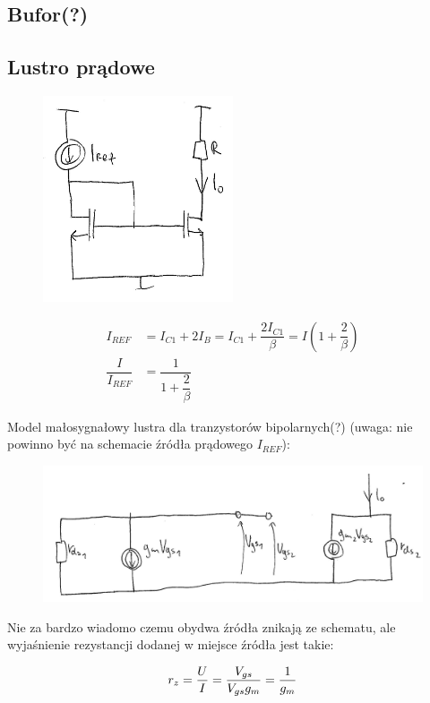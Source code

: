 \documentclass[10pt,a4paper]{article}
\begin{document}
\subsection{Bufor(?)}

\subsection{Lustro prądowe}
\begin{figure}[H]
\centering
\includegraphics[width=0.5\textwidth]{lustro}
\end{figure}
\begin{align*}
I_{REF}&=I_{C1}+2I_B=I_{C1}+\dfrac{2I_{C1}}{\beta}=I(1+\dfrac{2}{\beta}) \\
\dfrac{I}{I_{REF}}&=\dfrac{1}{1+\dfrac{2}{\beta}}
\end{align*}

Model małosygnałowy lustra dla tranzystorów bipolarnych(?) (uwaga: nie powinno być na schemacie źródła prądowego $I_{REF}$):
\begin{figure}[H]
\centering
\includegraphics[scale=0.8]{lustr_wyp1}
\end{figure}

Nie za bardzo wiadomo czemu obydwa źródła znikają ze schematu, ale wyjaśnienie rezystancji dodanej w miejsce źródła jest takie:

\begin{equation}
r_z = {U \over I} = {V_{gs} \over V_{gs}g_m} = {1 \over g_m}
\end{equation}
\end{document}
